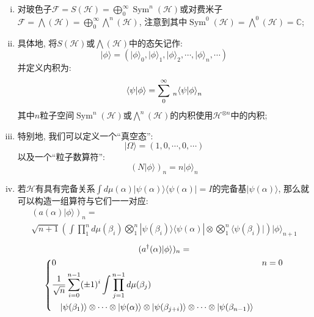 \begin{enumerate}[(i)]
    \item 对玻色子$\mathcal{F}=S(\mathcal{H})=\bigoplus_0^\infty \operatorname{Sym}^n(\mathcal{H})$或对费米子$\mathcal{F}=\operatorname{\bigwedge}(\mathcal{H})=\bigoplus_0^\infty \operatorname{\bigwedge}^n(\mathcal{H})$, 注意到其中$\operatorname{Sym}^0(\mathcal{H})=\operatorname{\bigwedge}^0(\mathcal{H})=\mathbb{C}$;
    \item 具体地, 将$S(\mathcal{H})$或$\operatorname{\bigwedge}(\mathcal{H})$中的态矢记作:
    \begin{equation}
        |\phi\rangle=(|{\phi\rangle}_0, {|\phi\rangle}_1, {|\phi\rangle}_2, \cdots, {|\phi\rangle}_n, \cdots)
    \end{equation}
    并定义内积为:
    \begin{equation}
        \langle\psi|\phi\rangle=\sum_{0}^\infty \sideset{_n}{_n}{\mathop{\langle\psi|\phi\rangle}}
    \end{equation}
    其中$n$粒子空间$\operatorname{Sym}^n(\mathcal{H})$或$\operatorname{\bigwedge}^n(\mathcal{H})$的内积使用$\mathcal{H}^{\otimes n}$中的内积;
    \item 特别地, 我们可以定义一个``真空态'':
    \begin{equation}
        |\Omega\rangle=(1, 0, \cdots, 0, \cdots)
    \end{equation}
    以及一个``粒子数算符'':
    \begin{equation}
        {(N|\phi\rangle)}_n=n{|\phi\rangle}_n
    \end{equation}
    \item 若$\mathcal{H}$有具有完备关系$\int d\mu(\alpha) |\psi(\alpha)\rangle\langle\psi(\alpha)|=I$的完备基$|\psi(\alpha)\rangle$, 那么就可以构造一组算符与它们一一对应:
    \begin{multline}
        (a(\alpha)|\phi\rangle)_n=\\
        \sqrt{n+1}\left(\int\prod_1^n d\mu(\beta_i) \bigotimes_1^n|\psi(\beta_i)\rangle\langle\psi(\alpha)|\otimes\bigotimes_1^n\langle\psi(\beta_i)|\right)|\phi\rangle_{n+1}
    \end{multline}
    \begin{multline}
        (a^\dagger(\alpha)|\phi\rangle)_n=\\
        \begin{dcases}
            0&n=0\\
            \frac{1}{\sqrt{n}}\sum_{i=0}^{n-1}(\pm1)^i\int\prod_{j=1}^{n-1} d\mu(\beta_j)\\
            \quad|\psi(\beta_1)\rangle\otimes\cdots\otimes|\psi(\alpha)\rangle\otimes|\psi(\beta_{j+i})\rangle\otimes\cdots\otimes|\psi(\beta_{n-1})\rangle\\

\end{dcases}
\end{multline}
\end{enumerate}
